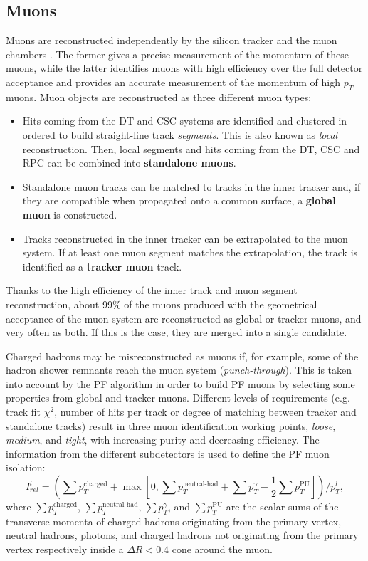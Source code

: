 \documentclass[../main.tex]{subfiles}
\begin{document}
\subsection{Muons}
\label{intro:subsec:muon}

Muons are reconstructed independently by the silicon tracker and the muon chambers \cite{intro:id:muon_7tev}. The former gives a precise measurement of the momentum of these muons, while the latter identifies muons with high efficiency over the full detector acceptance and provides an accurate measurement of the momentum of high $p_T$ muons. Muon objects are reconstructed as three different muon types:
\begin{itemize}
\item Hits coming from the DT and CSC systems are identified and clustered in ordered to build straight-line track \textit{segments}. This is also known as \textit{local} reconstruction. Then, local segments and hits coming from the DT, CSC and RPC can be combined into \textbf{standalone muons}.
\item Standalone muon tracks can be matched to tracks in the inner tracker and, if they are compatible when propagated onto a common surface, a \textbf{global muon} is constructed.
\item Tracks reconstructed in the inner tracker can be extrapolated to the muon system. If at least one muon segment matches the extrapolation, the track is identified as a \textbf{tracker muon} track.
\end{itemize}

Thanks to the high efficiency of the inner track and muon segment reconstruction, about 99\% of the muons produced with the geometrical acceptance of the muon system are reconstructed as global or tracker muons, and very often as both. If this is the case, they are merged into a single candidate.

Charged hadrons may be misreconstructed as muons if, for example, some of the hadron shower remnants reach the muon system (\textit{punch-through}). This is taken into account by the PF algorithm in order to build PF muons by selecting some properties from global and tracker muons. Different levels of requirements (e.g. track fit $\chi^2$, number of hits per track or degree of matching between tracker and standalone tracks) result in three muon identification working points, \textit{loose}, \textit{medium}, and \textit{tight}, with increasing purity and decreasing efficiency. The information from the different subdetectors is used to define the PF muon isolation:
\begin{equation}
	I_{rel}^l = \left(\sum p_T^{\text{charged}} + \max \left[ 0, \sum p_T^{\text{neutral-had}}  + \sum p_T^\gamma - \frac{1}{2}\sum p_T^{\text{PU}}	
	 \right] \right) / p_T^l,
\label{id:eq:iso}
\end{equation}
where $\sum p_T^{\text{charged}}$, $\sum p_T^{\text{neutral-had}}$, $\sum p_T^\gamma$, and $\sum p_T^{\text{PU}}$ are the scalar sums of the transverse momenta of charged hadrons originating from the primary vertex, neutral hadrons, photons, and charged hadrons not originating from the primary vertex respectively inside a $\Delta R < 0.4$ cone around the muon.
\end{document}
